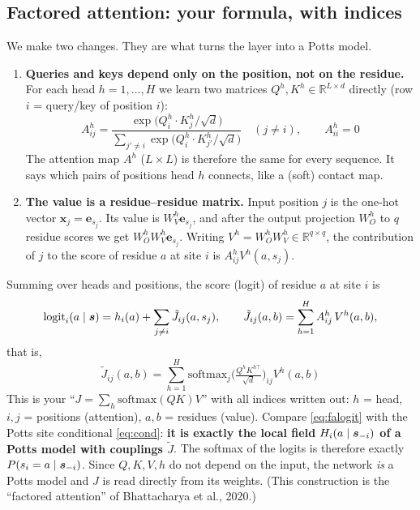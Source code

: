 \subsection{Factored attention: your formula, with indices}
We make two changes. They are what turns the layer into a Potts model.
\begin{enumerate}
\item \textbf{Queries and keys depend only on the position, not on the residue.} For each head
$h=1,\dots,H$ we learn two matrices $Q^h,K^h\in\mathbb R^{L\times d}$ directly (row $i$ = query/key of
position $i$):
\begin{equation}\label{eq:attn}
\boxed{\;A^h_{ij}=\frac{\exp\big(Q^h_i\cdot K^h_j/\sqrt d\big)}{\sum_{j'\neq i}\exp\big(Q^h_i\cdot K^h_{j'}/\sqrt d\big)}\quad(j\neq i),\qquad A^h_{ii}=0\;}
\end{equation}
The attention map $A^h$ ($L\times L$) is therefore the same for every sequence. It says which pairs of
positions head $h$ connects, like a (soft) contact map.
\item \textbf{The value is a residue--residue matrix.} Input position $j$ is the one-hot vector
$\bm x_j=\bm e_{s_j}$. Its value is $W_V^h\bm e_{s_j}$, and after the output projection $W_O^h$ to $q$
residue scores we get $W_O^hW_V^h\bm e_{s_j}$. Writing $V^h=W^h_OW^h_V\in\mathbb R^{q\times q}$, the
contribution of $j$ to the score of residue $a$ at site $i$ is $A^h_{ij}V^h(a,s_j)$.
\end{enumerate}
Summing over heads and positions, the score (logit) of residue $a$ at site $i$ is
\begin{equation}\label{eq:falogit}
\text{logit}_i(a\mid\bm{s})=h_i(a)+\sum_{j\neq i}\tilde J_{ij}(a,s_j),\qquad
\tilde J_{ij}(a,b)=\sum_{h=1}^H A^h_{ij}\,V^h(a,b),
\end{equation}
that is,
\begin{equation}\label{eq:jformula}
\boxed{\;\tilde J_{ij}(a,b)=\sum_{h=1}^{H}\mathrm{softmax}_j\!\Big(\tfrac{Q^hK^{h\top}}{\sqrt d}\Big)_{ij}V^h(a,b)\;}
\end{equation}
This is your ``$J=\sum_h\mathrm{softmax}(QK)V$'' with all indices written out: $h$ = head, $i,j$ = positions
(attention), $a,b$ = residues (value). Compare \eqref{eq:falogit} with the Potts site conditional
\eqref{eq:cond}: \textbf{it is exactly the local field $H_i(a\mid\bm{s}_{-i})$ of a Potts model with couplings
$\tilde J$}. The softmax of the logits is therefore exactly $P(s_i=a\mid\bm{s}_{-i})$. Since $Q,K,V,h$ do not
depend on the input, the network \emph{is} a Potts model and $J$ is read directly from its weights.
(This construction is the ``factored attention'' of Bhattacharya et al., 2020.)

